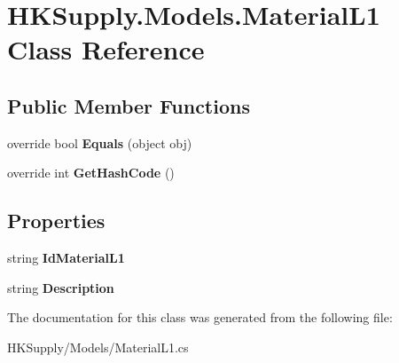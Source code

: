 \hypertarget{class_h_k_supply_1_1_models_1_1_material_l1}{}\section{H\+K\+Supply.\+Models.\+Material\+L1 Class Reference}
\label{class_h_k_supply_1_1_models_1_1_material_l1}
\subsection*{Public Member Functions}
\begin{DoxyCompactItemize}
\item 
\mbox{\label{class_h_k_supply_1_1_models_1_1_material_l1_a82aa112121257cf12a4c4c160b222835}} 
override bool {\bfseries Equals} (object obj)
\item 
\mbox{\label{class_h_k_supply_1_1_models_1_1_material_l1_a56879516a386c8a26930d57721fad80c}} 
override int {\bfseries Get\+Hash\+Code} ()
\end{DoxyCompactItemize}
\subsection*{Properties}
\begin{DoxyCompactItemize}
\item 
\mbox{\label{class_h_k_supply_1_1_models_1_1_material_l1_afdd32e09a3fa849cabb9c9097ba421eb}} 
string {\bfseries Id\+Material\+L1}
\item 
\mbox{\label{class_h_k_supply_1_1_models_1_1_material_l1_ae1458abeba0690879979db0dda15d687}} 
string {\bfseries Description}
\end{DoxyCompactItemize}


The documentation for this class was generated from the following file\+:\begin{DoxyCompactItemize}
\item 
H\+K\+Supply/\+Models/Material\+L1.\+cs\end{DoxyCompactItemize}
